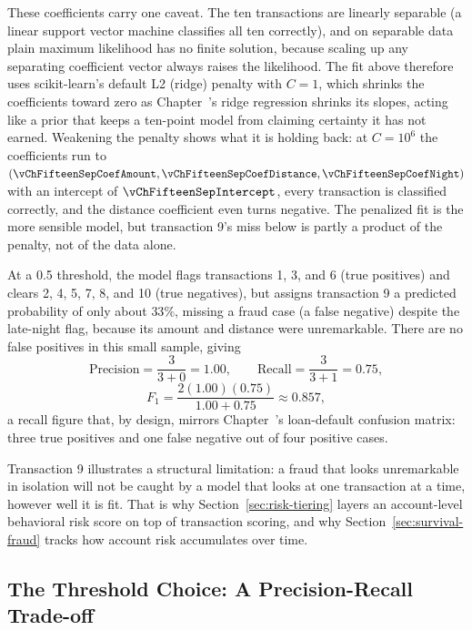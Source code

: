 \documentclass[../ai_in_finance]{subfiles}
\begin{document}
These coefficients carry one caveat. The ten transactions are linearly separable (a linear support vector machine classifies all ten correctly), and on separable data plain maximum likelihood has no finite solution, because scaling up any separating coefficient vector always raises the likelihood. The fit above therefore uses scikit-learn's default L2 (ridge) penalty with $C=1$, which shrinks the coefficients toward zero as Chapter~'s ridge regression shrinks its slopes, acting like a prior that keeps a ten-point model from claiming certainty it has not earned. Weakening the penalty shows what it is holding back: at $C=10^6$ the coefficients run to $(\vChFifteenSepCoefAmount, \vChFifteenSepCoefDistance, \vChFifteenSepCoefNight)$ with an intercept of $\vChFifteenSepIntercept$, every transaction is classified correctly, and the distance coefficient even turns negative. The penalized fit is the more sensible model, but transaction 9's miss below is partly a product of the penalty, not of the data alone.

At a 0.5 threshold, the model flags transactions 1, 3, and 6 (true positives) and clears 2, 4, 5, 7, 8, and 10 (true negatives), but assigns transaction 9 a predicted probability of only about $33\%$, missing a fraud case (a false negative) despite the late-night flag, because its amount and distance were unremarkable. There are no false positives in this small sample, giving
\begin{equation*}
\text{Precision} = \frac{3}{3+0} = 1.00, \qquad \text{Recall} = \frac{3}{3+1} = 0.75,
\end{equation*}
\begin{equation*}
 F_1 = \frac{2(1.00)(0.75)}{1.00+0.75} \approx 0.857,
\end{equation*}
a recall figure that, by design, mirrors Chapter~'s loan-default confusion matrix: three true positives and one false negative out of four positive cases.

Transaction 9 illustrates a structural limitation: a fraud that looks unremarkable in isolation will not be caught by a model that looks at one transaction at a time, however well it is fit. That is why Section~\ref{sec:risk-tiering} layers an account-level behavioral risk score on top of transaction scoring, and why Section~\ref{sec:survival-fraud} tracks how account risk accumulates over time.

\subsection{The Threshold Choice: A Precision-Recall Trade-off}
\label{sec:threshold-choice}
\end{document}
